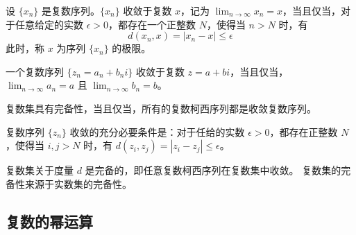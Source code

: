 \begin{definition}
    设 $\{x_n\}$ 是复数序列。$\{x_n\}$ 收敛于复数 $x$，记为 $\lim_{n\to\infty} x_n = x$，当且仅当，对于任意给定的实数 $\epsilon>0$，都存在一个正整数 $N$，使得当 $n>N$ 时，有
    \[
        d(x_n,x) = |x_n - x| \le \epsilon
    \]
    此时，称 $x$ 为序列 $\{x_n\}$ 的极限。
\end{definition}

\begin{proposition}
    一个复数序列 $\{z_n=a_n+b_n i\}$ 收敛于复数 $z=a+b i$，当且仅当，$\lim_{n\to\infty} a_n = a$ 且 $\lim_{n\to\infty} b_n = b$。
\end{proposition}
\vspace{1em}

\begin{theorem}
    复数集具有完备性，当且仅当，所有的复数柯西序列都是收敛复数序列。
\end{theorem}

\begin{theorem}
    复数序列 $\{z_n\}$ 收敛的充分必要条件是：对于任给的实数 $\epsilon>0$，都存在正整数 $N$，使得当 $i,j>N$ 时，有 $d(z_i,z_j) = |z_i - z_j| \le \epsilon$。
\end{theorem}

\begin{note}
    复数集关于度量 $d$ 是完备的，即任意复数柯西序列在复数集中收敛。
    复数集的完备性来源于实数集的完备性。
\end{note}

\vspace{1em}
\subsection{复数的幂运算}

